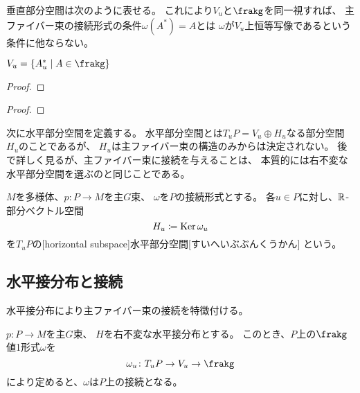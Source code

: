\documentclass[report]{jlreq}
\begin{document}
垂直部分空間は次のように表せる。
これにより$V_u$と$\frakg$を同一視すれば、
主ファイバー束の接続形式の条件$\omega(A^*) = A$とは
$\omega$が$V_u$上恒等写像であるという条件に他ならない。

\begin{proposition}
    $V_u = \{ A^*_u \mid A \in \frakg \}$
    \TODO{}
\end{proposition}

\begin{proof}
    \TODO{}
\end{proof}

\begin{theorem}[垂直接分布は積分可能]
    \TODO{}
\end{theorem}

\begin{proof}
    \TODO{}
\end{proof}

次に水平部分空間を定義する。
水平部分空間とは$T_u P = V_u \oplus H_u$なる部分空間$H_u$のことであるが、
$H_u$は主ファイバー束の構造のみからは決定されない。
後で詳しく見るが、主ファイバー束に接続を与えることは、
本質的には右不変な水平部分空間を選ぶのと同じことである。


\begin{definition}[水平部分空間]
    $M$を多様体、$p \colon P \to M$を主$G$束、
    $\omega$を$P$の接続形式とする。
    各$u \in P$に対し、$\mathbb{R}$-部分ベクトル空間
    \begin{equation}
        H_u \coloneqq \operatorname{\mathrm{Ker}} \omega_u
    \end{equation}
    を$T_uP$の[horizontal subspace]{水平部分空間}[すいへいぶぶんくうかん]
    という。
\end{definition}

\subsection{水平接分布と接続}

水平接分布により主ファイバー束の接続を特徴付ける。

\begin{theorem}[水平接分布から接続へ]
    $p \colon P \to M$を主$G$束、
    $H$を右不変な水平接分布とする。
    このとき、$P$上の$\frakg$値1形式$\omega$を
    \begin{equation}
        \omega_u \colon T_u P \to V_u \to \frakg
    \end{equation}
    により定めると、$\omega$は$P$上の接続となる。
\end{theorem}
\end{document}
